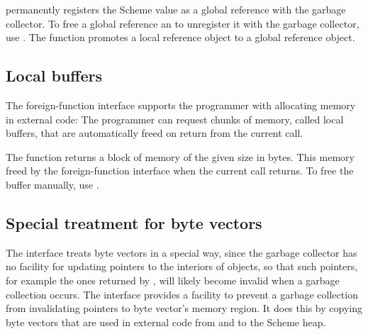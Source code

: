 \begin{protos}
\end{protos}

\noindent{} permanently registers the
Scheme value  as a global reference with the garbage
collector.  To free a global reference an to unregister it with the
garbage collector, use .  The function
 promotes a local reference object
to a global reference object.

\subsection{Local buffers}
\label{sec:local-bufs}

The foreign-function interface supports the programmer with allocating
memory in external code: The programmer can request chunks of memory,
called local buffers, that are automatically freed on return from the
current call.

\begin{protos}
\end{protos}

The function  returns a block of memory of
the given size in bytes.  This memory freed by the foreign-function
interface when the current call returns.  To free the buffer manually,
use .

\subsection{Special treatment for byte vectors}
\label{sec:byte-vectors}

The interface treats byte vectors in a special way, since the garbage
collector has no facility for updating pointers to the interiors of
objects, so that such pointers, for example the ones returned by
, will likely become
invalid when a garbage collection occurs.  The interface provides a
facility to prevent a garbage collection from invalidating pointers to
byte vector's memory region.  It does this by copying byte vectors
that are used in external code from and to the Scheme heap.

